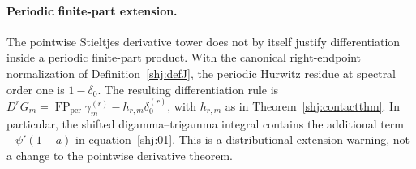 \paragraph{Periodic finite-part extension.}
The pointwise Stieltjes derivative tower does not by itself justify
differentiation inside a periodic finite-part product.
With the canonical right-endpoint normalization of
Definition~\ref{shj:defJ}, the periodic Hurwitz residue at spectral
order one is \(1-\delta_0\).
The resulting differentiation rule is
\(D^rG_m=\operatorname{FP}_{\mathrm{per}}\gamma_m^{(r)}
-h_{r,m}\delta_0^{(r)}\), with \(h_{r,m}\) as in
Theorem~\ref{shj:contactthm}.
In particular, the shifted digamma--trigamma integral contains the
additional term \(+\psi'(1-a)\) in equation~\eqref{shj:01}.
This is a distributional extension warning, not a change to the
pointwise derivative theorem.
